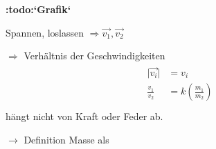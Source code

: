 \documentclass[a4paper,10pt,ngerman]{sphinxmanual}
\begin{document}
{\color{red}\bfseries{}:todo:{}`Grafik{}`}

Spannen, loslassen \(\Rightarrow \vec{v_1},\vec{v_2}\)

\(\Rightarrow\) Verhältnis der Geschwindigkeiten
\begin{align*}\!\begin{aligned}
{\lvert}\vec{v_i}{\rvert} &= v_i\\
\frac{v_1}{v_2} &= k(\frac{m_1}{m_2})\\
\end{aligned}\end{align*}
hängt nicht von Kraft oder Feder ab.

\(\rightarrow\) Definition Masse als 



\renewcommand{\indexname}{Stichwortverzeichnis}
\printindex
\end{document}
